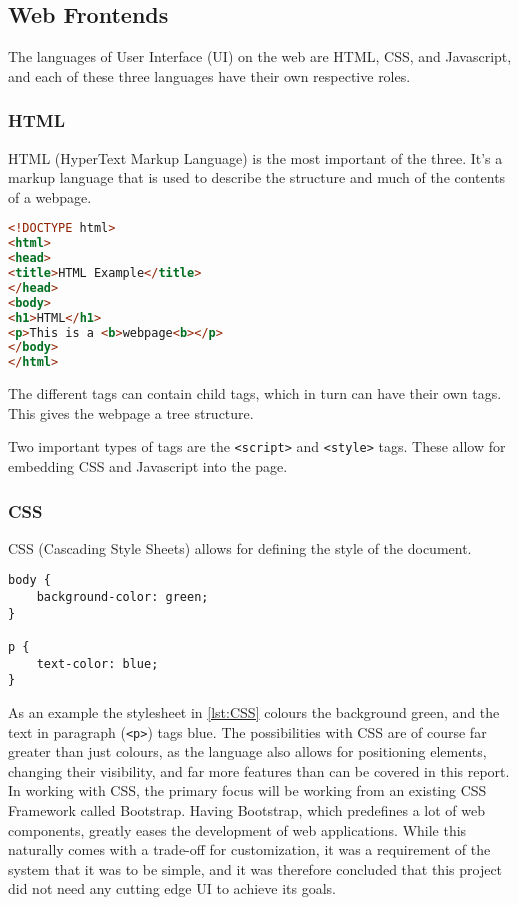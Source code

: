 \documentclass[../../master.tex]{subfiles}
\begin{document}
\subsection{Web Frontends} \label{sec:webfrontends}
The languages of User Interface (UI) on the web are HTML, CSS, and Javascript, and each of these three languages have their own respective roles.\cite{nixonweb}
\subsubsection*{HTML}
HTML (HyperText Markup Language) is the most important of the three.
It's a markup language that is used to describe the structure and much of the contents of a webpage.
\begin{lstlisting}[language=HTML,caption={An example HTML page},label=lst:HTML]
<!DOCTYPE html>
<html>
<head>
<title>HTML Example</title>
</head>
<body>
<h1>HTML</h1>
<p>This is a <b>webpage<b></p>
</body>
</html>
\end{lstlisting}
The different tags can contain child tags, which in turn can have their own tags.
This gives the webpage a tree structure.

Two important types of tags are the \texttt{<script>} and \texttt{<style>} tags.
These allow for embedding CSS and Javascript into the page.

\subsubsection*{CSS}
CSS (Cascading Style Sheets) allows for defining the style of the document.
\begin{lstlisting}[caption={A simple CSS style with blue text on a green background},label=lst:CSS]
body {
	background-color: green;
}

p {
	text-color: blue;
}
\end{lstlisting}
As an example the stylesheet in \cref{lst:CSS} colours the background green, and the text in paragraph (\texttt{<p>}) tags blue.
The possibilities with CSS are of course far greater than just colours, as the language also allows for positioning elements, changing their visibility, and far more features than can be covered in this report.\cite{nixonweb}
In working with CSS, the primary focus will be working from an existing CSS Framework called Bootstrap.
Having Bootstrap, which predefines a lot of web components, greatly eases the development of web applications.
While this naturally comes with a trade-off for customization, it was a requirement of the system that it was to be simple, and it was therefore concluded that this project did not need any cutting edge UI to achieve its goals.
\end{document}
